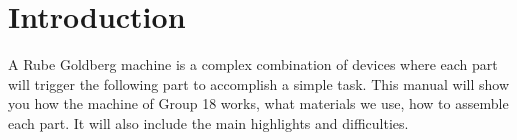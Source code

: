 \section{Introduction}
A Rube Goldberg machine is a complex combination of devices where each part will trigger the following part to accomplish a simple task. This manual will show you how the machine of Group 18 works, what materials we use, how to assemble each part. It will also include the main highlights and difficulties.